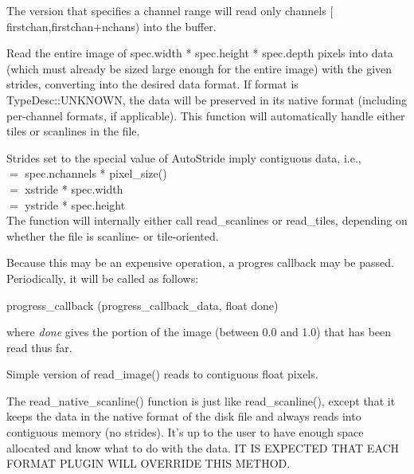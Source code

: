 The version that specifies a channel range will read only
channels $[${\cf firstchan},{\cf firstchan+nchans}$)$ into the buffer.
\apiend



Read the entire image of {\kw spec.width * spec.height * spec.depth}
pixels into data (which must already be sized large enough for
the entire image) with the given strides, converting into the desired
data format.  
If {\cf format} is {\cf TypeDesc::UNKNOWN}, the data will be preserved 
in its native format (including per-channel formats, if applicable).
This function will automatically handle either tiles or scanlines in
the file.

Strides set to the special value of {\kw AutoStride} imply contiguous
data, i.e., \\
 $=$ {\kw spec.nchannels * pixel_size()} \\
 $=$ {\kw xstride * spec.width} \\
 $=$ {\kw ystride * spec.height} \\
The function will internally either call {\kw read_scanlines} or 
{\kw read_tiles}, depending on whether the file is scanline- or
tile-oriented.

Because this may be an expensive operation, a progres callback may be passed.
Periodically, it will be called as follows:\\
\begin{code}
    progress_callback (progress_callback_data, float done)
\end{code}
\noindent where \emph{done} gives the portion of the image 
(between 0.0 and 1.0) that has been read thus far.
\apiend

Simple version of {\kw read_image()} reads to contiguous float pixels.
\apiend

The {\kw read_native_scanline()} function is just like {\kw
  read_scanline()}, except that it keeps the data in the native format
of the disk file and always reads into contiguous memory (no strides).
It's up to the user to have enough space allocated and know what to do
with the data.  IT IS EXPECTED THAT EACH FORMAT PLUGIN WILL OVERRIDE
THIS METHOD.
\apiend

